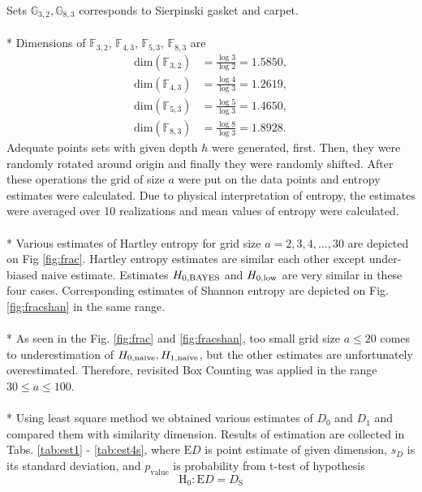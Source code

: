 Sets $\mathbb{G}_{3,2}, \mathbb{G}_{8,3}$ corresponds to Sierpinski gasket and carpet. \\
\\*
Dimensions of $\mathbb{F}_{3,2}$, $\mathbb{F}_{4,3}$, $\mathbb{F}_{5,3}$, $\mathbb{F}_{8,3}$ are
\begin{equation} 
\label{eq:fracdim}
\begin{split}
\text{dim}(\mathbb{F}_{3,2}) & = \frac{\log{3}}{\log{2}} = 1.5850, \\
\text{dim}(\mathbb{F}_{4,3}) & = \frac{\log{4}}{\log{3}} = 1.2619, \\
\text{dim}(\mathbb{F}_{5,3}) & = \frac{\log{5}}{\log{3}} = 1.4650, \\
\text{dim}(\mathbb{F}_{8,3}) & = \frac{\log{8}}{\log{3}} = 1.8928.
\end{split}
\end{equation}
Adequate points sets with given depth $h$ were generated, first. Then, they were randomly rotated around origin and finally they were randomly shifted. After these operations the grid of size $a$ were put on the data points and entropy estimates were calculated. Due to physical interpretation of entropy, the estimates were averaged over 10 realizations and mean values of entropy were calculated. \\
\\*
Various estimates of Hartley entropy for grid size $a=2,3,4,...,30$ are depicted on Fig \ref{fig:frac}. Hartley entropy estimates are similar each other except under-biased naive estimate. Estimates $H_{0,\mbox{\scriptsize{BAYES}}}$ and $H_{0,\mbox{\scriptsize{low}}}$ are very similar in these four cases. Corresponding estimates of Shannon entropy are depicted on Fig. \ref{fig:fracshan} in the same range. \\
\\*
As seen in the Fig. \ref{fig:frac} and \ref{fig:fracshan}, too small grid size $a \leq 20$ comes to underestimation of $H_{0,\mbox{\scriptsize{naive}}}, H_{1,\mbox{\scriptsize{naive}}}$, but the other estimates are unfortunately overestimated. Therefore, revisited Box Counting was applied in the range $30 \leq a \leq 100$.\\
\\*
Using least square method we obtained various estimates of $D_{0}$ and $D_{1}$ and compared them with similarity dimension. Results of estimation are collected in Tabs. \ref{tab:est1} - \ref{tab:est4s}, where $\text{E}D$ is point estimate of given dimension, $s_{D}$ is its standard deviation, and $p_{\text{value}}$ is probability from t-test of hypothesis
\begin{equation} 
\label{eq:hypo}
\text{H}_{0} : \text{E}D = D_{\text{S}}
\end{equation}